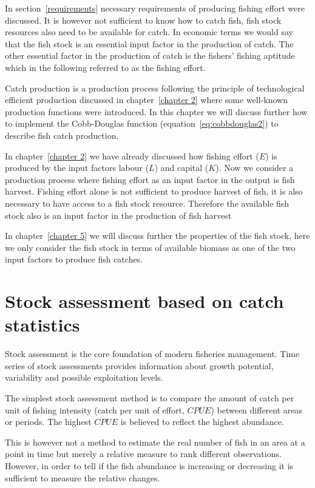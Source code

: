 \documentclass[11pt,fleqn]{book} %
\begin{document}
In section~\ref{requirements} necessary requirements of producing fishing effort were discussed. It is however not sufficient to know how to catch fish, fish stock resources also need to be available for catch. In economic terms we would say that the fish stock is an essential input factor in the production of catch. The other essential factor in the production of catch is the fishers' fishing aptitude which in the following referred to as the fishing effort.

Catch production is a production process following the principle of technological efficient production discussed in chapter~\ref{chapter 2} where some well-known production functions were introduced. In this chapter we will discuss further how to implement the Cobb-Douglas function (equation~\ref{eq:cobbdouglas2}) to describe fish catch production.

In chapter~\ref{chapter 2} we have already discussed how fishing effort ($E$) is produced by the input factors labour ($L$) and capital ($K$). Now we consider a production process where fishing effort as an input factor in the output is fish harvest. Fishing effort alone is not sufficient to produce harvest of fish, it is also necessary to have access to a fish stock resource. Therefore the available fish stock also is an input factor in the production of fish harvest

In chapter~\ref{chapter 5} we will discuss further the properties of the fish stock, here we only consider the fish stock in terms of available biomass as one of the two input factors to produce fish catches.

\section{Stock assessment based on catch statistics}

Stock assessment is the core foundation of modern fisheries management. Time series of stock assessments provides information about growth potential, variability and possible exploitation levels.

The simplest stock assessment method is to compare the amount of catch per unit of fishing intensity (catch per unit of effort, $CPUE$) between different areas or periods. The highest $CPUE$ is believed to reflect the highest abundance.

This is however not a method to estimate the real number of fish in an area at a point in time but merely a relative measure to rank different observations. However, in order to tell if the fish abundance is increasing or decreasing it is sufficient to measure the relative changes.
\end{document}
